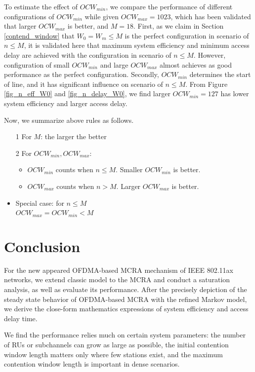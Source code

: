 \documentclass[journal]{IEEEtran}
\begin{document}
To estimate the effect of $OCW_{min}$, we compare the performance of different configurations of $OCW_{min}$ while given $OCW_{max}=1023$, which has been validated that larger $OCW_{max}$ is better, and $M=18$. 
First, as we claim in Section \ref{contend_window} that $W_0=W_m\leq M$ is the perfect configuration in scenario of $n\leq M$, it is validated here that maximum system efficiency and minimum access delay are achieved with the configuration in scenario of $n\leq M$.
However, configuration of small $OCW_{min}$ and large $OCW_{max}$ almost achieves as good performance as the perfect configuration.  
Secondly, $OCW_{min}$ determines the start of line, and it has significant influence on scenario of $n\leq M$.
From Figure \ref{fig_n_eff_W0} and \ref{fig_n_delay_W0}, we find larger $OCW_{min}=127$ has lower system efficiency and larger access delay. 

Now, we summarize above rules as follows.
 
\begin{itemize}
\item[1] For $M$: the larger the better
\item[2] For $OCW_{min}, OCW_{max}$:
	\begin{itemize}
	\item $OCW_{min}$ counts when $n\leq M$. Smaller $OCW_{min}$ is better.
	\item $OCW_{max}$ counts when $n>M$. Larger $OCW_{max}$ is better.
	\end{itemize}
\end{itemize}
\begin{itemize}
	\item Special case: for $n\leq M$\\
	$OCW_{max}=OCW_{min}<M$ 
\end{itemize}





\section{Conclusion}   \label{sec_conclu}
For the new appeared OFDMA-based MCRA mechanism of IEEE 802.11ax networks, we extend classic model to the MCRA and conduct a saturation analysis, as well as evaluate its performance.
After the precisely depiction of the steady state behavior of OFDMA-based MCRA with
the refined Markov model, we derive the close-form mathematics expressions of system efficiency and access delay time. 

We find the performance relies much on certain system parameters: the number of RUs or subchannels can grow as large as possible, the initial contention window length matters only where few stations exist, and the maximum contention window length is important in dense scenarios.
\end{document}
